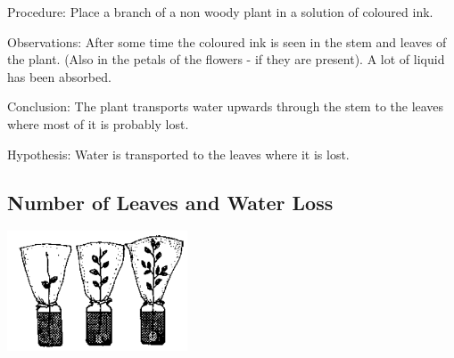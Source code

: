 \begin{multicols}{2}
\begin{description*}
\item[Procedure:]{Place a branch of a non woody plant in a solution of coloured ink.}
\item[Observations:]{After some time the coloured ink is seen in the stem and leaves of the plant.
(Also in the petals of the flowers - if they are present). A lot of liquid has been absorbed.}
\item[Conclusion:]{The plant transports water upwards through the stem to the leaves where most of
it is probably lost.}
\item[Hypothesis:]{Water is transported to the leaves where it is lost.}
\end{description*}

\subsection{Number of Leaves and Water Loss}

\begin{center}
\includegraphics[width=0.4\textwidth]{./img/source/sci-meth-lose-water.png}
\end{center}


\end{multicols}
